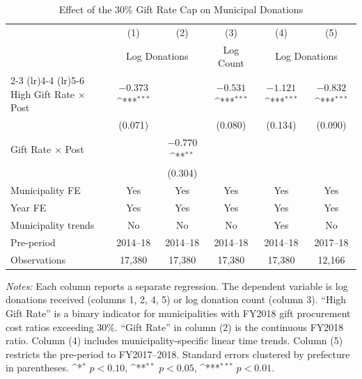 \documentclass[12pt]{article}
\newcommand{\sym}[1]{\ifmmode^{#1}\else\(^{#1}\)\fi}
\begin{document}
\begin{table}[htbp]
\centering
\caption{Effect of the 30\% Gift Rate Cap on Municipal Donations}
\label{tab:main}
\begin{threeparttable}
\begin{tabular}{lccccc}
\toprule
 & (1) & (2) & (3) & (4) & (5) \\
 & \multicolumn{2}{c}{Log Donations} & Log Count & \multicolumn{2}{c}{Log Donations} \\
\cmidrule(lr){2-3} \cmidrule(lr){4-4} \cmidrule(lr){5-6}
\midrule
High Gift Rate $\times$ Post & $-0.373$\sym{***} &  & $-0.531$\sym{***} & $-1.121$\sym{***} & $-0.832$\sym{***} \\
 & (0.071) &  & (0.080) & (0.134) & (0.090) \\
Gift Rate $\times$ Post &  & $-0.770$\sym{**} &  &  &  \\
 &  & (0.304) &  &  &  \\
\midrule
Municipality FE & Yes & Yes & Yes & Yes & Yes \\
Year FE & Yes & Yes & Yes & Yes & Yes \\
Municipality trends & No & No & No & Yes & No \\
Pre-period & 2014--18 & 2014--18 & 2014--18 & 2014--18 & 2017--18 \\
Observations & 17,380 & 17,380 & 17,380 & 17,380 & 12,166 \\
\bottomrule
\end{tabular}
\begin{tablenotes}[flushleft]
\small
\item \textit{Notes:} Each column reports a separate regression. The dependent variable is log donations received (columns 1, 2, 4, 5) or log donation count (column 3). ``High Gift Rate'' is a binary indicator for municipalities with FY2018 gift procurement cost ratios exceeding 30\%. ``Gift Rate'' in column (2) is the continuous FY2018 ratio. Column (4) includes municipality-specific linear time trends. Column (5) restricts the pre-period to FY2017--2018. Standard errors clustered by prefecture in parentheses. \sym{*} $p < 0.10$, \sym{**} $p < 0.05$, \sym{***} $p < 0.01$.
\end{tablenotes}
\end{threeparttable}
\end{table}



\end{document}
